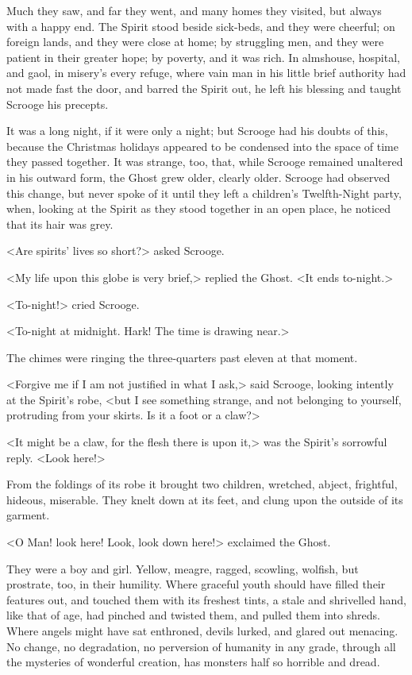 Much they saw, and far they went, and many homes they visited, but always with a happy end. The Spirit stood beside sick-beds, and they were cheerful; on foreign lands, and they were close at home; by struggling men, and they were patient in their greater hope; by poverty, and it was rich. In almshouse, hospital, and gaol, in misery's every refuge, where vain man in his little brief authority had not made fast the door, and barred the Spirit out, he left his blessing and taught Scrooge his precepts.

It was a long night, if it were only a night; but Scrooge had his doubts of this, because the Christmas holidays appeared to be condensed into the space of time they passed together. It was strange, too, that, while Scrooge remained unaltered in his outward form, the Ghost grew older, clearly older. Scrooge had observed this change, but never spoke of it until they left a children's Twelfth-Night party, when, looking at the Spirit as they stood together in an open place, he noticed that its hair was grey.

<Are spirits' lives so short?> asked Scrooge.

<My life upon this globe is very brief,> replied the Ghost. <It ends to-night.>

<To-night!> cried Scrooge.

<To-night at midnight. Hark! The time is drawing near.>

The chimes were ringing the three-quarters past eleven at that moment.

<Forgive me if I am not justified in what I ask,> said Scrooge, looking intently at the Spirit's robe, <but I see something strange, and not belonging to yourself, protruding from your skirts. Is it a foot or a claw?>

<It might be a claw, for the flesh there is upon it,> was the Spirit's sorrowful reply. <Look here!>

From the foldings of its robe it brought two children, wretched, abject, frightful, hideous, miserable. They knelt down at its feet, and clung upon the outside of its garment.

<O Man! look here! Look, look down here!> exclaimed the Ghost.

They were a boy and girl. Yellow, meagre, ragged, scowling, wolfish, but prostrate, too, in their humility. Where graceful youth should have filled their features out, and touched them with its freshest tints, a stale and shrivelled hand, like that of age, had pinched and twisted them, and pulled them into shreds. Where angels might have sat enthroned, devils lurked, and glared out menacing. No change, no degradation, no perversion of humanity in any grade, through all the mysteries of wonderful creation, has monsters half so horrible and dread.

